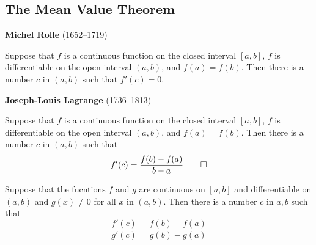 \subsection{The Mean Value Theorem}
\textbf{Michel Rolle} (1652--1719)
\begin{theorem}
    Suppose that \(f\) is a continuous function on the closed interval \([a,b]\),
    \(f\) is differentiable on the open interval \((a,b)\), and \(f(a)=f(b)\).
    Then there is a number \(c\) in \((a,b)\) such that \(f'(c)=0\).
\end{theorem}
\textbf{Joseph-Louis Lagrange} (1736--1813)
\begin{theorem}
    Suppose that \(f\) is a continuous function on the closed interval \([a,b]\),
    \(f\) is differentiable on the open interval \((a,b)\), and \(f(a)=f(b)\).
    Then there is a number \(c\) in \((a,b)\) such that
    \[f'(c)=\frac{f(b)-f(a)}{b-a}\qedhere\]
\end{theorem}
\begin{theorem}
    Suppose that the fucntions \(f\) and \(g\) are continuous on \([a,b]\) and
    differentiable on \((a,b)\) and \(g(x)\neq 0\) for all \(x\) in \((a,b)\).
    Then there is a number \(c\) in \(a,b\) such that
    \[\frac{f'(c)}{g'(c)}=\frac{f(b)-f(a)}{g(b)-g(a)}\]
\end{theorem}